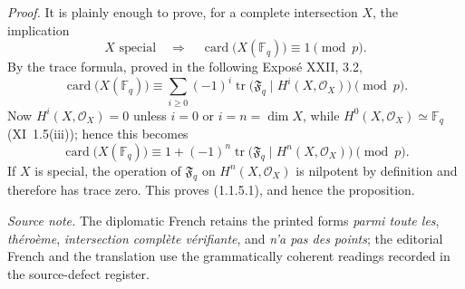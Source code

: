 \medskip
\noindent\emph{Proof.}
It is plainly enough to prove, for a complete intersection $X$, the
implication
\begin{equation}\tag{1.1.5.1}
X\text{ special}\quad\Longrightarrow\quad
\operatorname{card}\bigl(X(\mathbb F_q)\bigr)\equiv1\pmod p.
\end{equation}
By the trace formula, proved in the following Exposé XXII, 3.2,
\begin{equation*}
\operatorname{card}\bigl(X(\mathbb F_q)\bigr)
\equiv\sum_{i\geq0}(-1)^i
\operatorname{tr}\bigl(\mathfrak F_q\mid H^i(X,\mathcal O_X)\bigr)
\pmod p.
\end{equation*}
Now $H^i(X,\mathcal O_X)=0$ unless $i=0$ or $i=n=\dim X$, while
$H^0(X,\mathcal O_X)\simeq\mathbb F_q$ (XI~1.5(iii)); hence this becomes
\begin{equation*}
\operatorname{card}\bigl(X(\mathbb F_q)\bigr)
\equiv1+(-1)^n
\operatorname{tr}\bigl(\mathfrak F_q\mid H^n(X,\mathcal O_X)\bigr)
\pmod p.
\end{equation*}
If $X$ is special, the operation of $\mathfrak F_q$ on
$H^n(X,\mathcal O_X)$ is nilpotent by definition and therefore has trace
zero.  This proves (1.1.5.1), and hence the proposition.

\medskip
\noindent\emph{Source note.}
The diplomatic French retains the printed forms \emph{parmi toute les},
\emph{théroème}, \emph{intersection complète vérifiante}, and
\emph{n'a pas des points}; the editorial French and the translation use the
grammatically coherent readings recorded in the source-defect register.
